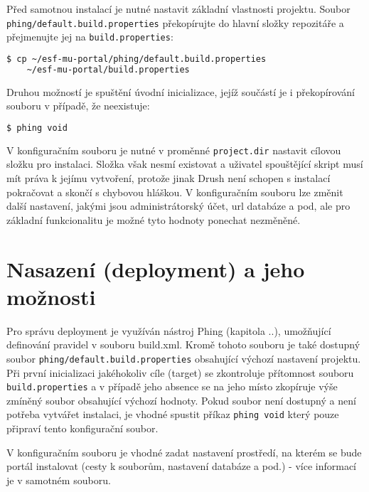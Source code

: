 Před samotnou instalací je nutné nastavit základní vlastnosti projektu. Soubor \texttt{phing/default.build.properties} překopírujte do hlavní složky repozitáře a přejmenujte jej na \texttt{build.properties}:

\begin{lstlisting}[language=bash]
  $ cp ~/esf-mu-portal/phing/default.build.properties 
    ~/esf-mu-portal/build.properties
\end{lstlisting}

Druhou možností je spuštění úvodní inicializace, jejíž součástí je i překopírování souboru v případě, že neexistuje:

\begin{lstlisting}[language=bash]
  $ phing void
\end{lstlisting}

V konfiguračním souboru je nutné v proměnné \texttt{project.dir} nastavit cílovou složku pro instalaci. Složka však nesmí existovat a uživatel spouštějící skript musí mít práva k jejímu vytvoření, protože jinak Drush není schopen s instalací pokračovat a skončí s chybovou hláškou. V konfiguračním souboru lze změnit další nastavení, jakými jsou administrátorský účet, url databáze a pod, ale pro základní funkcionalitu je možné tyto hodnoty ponechat nezměněné.


\section{Nasazení (deployment) a jeho možnosti}

Pro správu \gls{deployment} je využíván nástroj Phing (kapitola ..), umožňující definování pravidel v souboru build.xml. Kromě tohoto souboru je také dostupný soubor \linebreak \texttt{phing/\-default.build.properties} obsahující výchozí nastavení projektu. Při první inicializaci jakéhokoliv cíle (target) se zkontroluje přítomnost souboru \linebreak \texttt{build.properties} a v případě jeho absence se na jeho místo zkopíruje výše zmíněný soubor obsahující výchozí hodnoty. Pokud soubor není dostupný a není potřeba vytvářet instalaci, je vhodné spustit příkaz \texttt{phing void} který pouze připraví tento konfigurační soubor. 

V konfiguračním souboru je vhodné zadat nastavení prostředí, na kterém se bude portál instalovat (cesty k souborům, nastavení databáze a pod.) - více informací je v samotném souboru.

